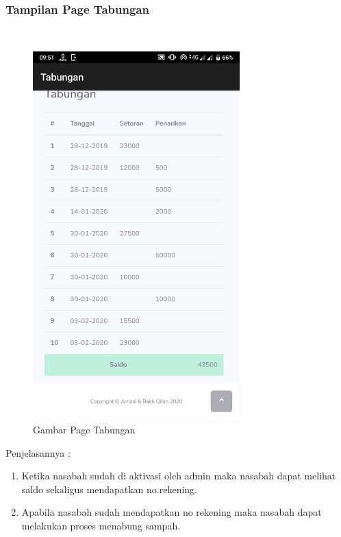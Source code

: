 \subsubsection{Tampilan Page Tabungan}
\hfill\\
	\begin{figure}[H]
		\includegraphics[width=8cm]{figures/analisis/37.png}
		\centering
		\caption{Gambar Page Tabungan}
	\end{figure}
Penjelasannya :
\begin{enumerate}
\item Ketika nasabah sudah di aktivasi oleh admin maka nasabah dapat melihat saldo sekaligus mendapatkan no.rekening.
\item Apabila nasabah sudah mendapatkan no rekening maka nasabah dapat melakukan proses menabung sampah.
\end{enumerate}